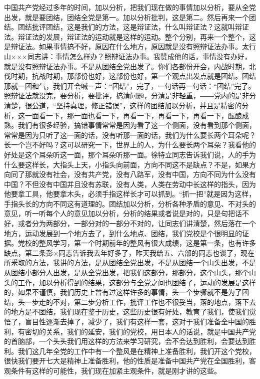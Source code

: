 中国共产党经过多年的时间，加以分析，把我们现在做的事情加以分析，要从全党出发，就是要团结，团结全党是第一。加以分析批判，这是第二。然后再来一个团结。团结批评团结，这是我们的方法，这是辩证法，什么叫辩证法？这就叫辩证法。辩证法的发展，辩证法的运动就是这样的运动。整个分别，再来一个整个，这是辩证法。如果事情搞不好，原因在什么地方，原因就是没有照辩证法办事。太行山×××同志讲：事情怎么样办？照辩证法办事。我赞成他的话，事情没有办好，就是没有照辩证法办事。不是从团结全党出发了。你们各部份开会，内战时期，北伐时期，抗战时期，那部份也好，这部份也好，第一个观点出发点就是团结。团结那就一团和气，我们开会喊一声：“团结”，完了，一句话再一句话：“团结”完了。照辩证法就没完，要分析，要批评，搞清问题，分清是非轻重，――党内的是非分清楚，很公道，“坚持真理，修正错误”，这样的团结加以分析，并且是精密的分析，这一面看一下，那一面也看一下，再看一下，再看一下，再看一下，酝酿成熟。我们有很多经验，搞错事情常常是因为看了这一个侧面，没有看到那个侧面，常常是因为只听了这一面的话，没有听那一面的话，我们为什么要长两个耳朵呢？长一个岂不好吗？这可以研究一下，世界上的人，为什么要长两个耳朵？我看他的好处是这个耳朵听这一面，那个耳朵听那一面。徐特立同志告诉我们说，人的手为什么要这样长，大指头上天，小指头向前面，方向不同这不是缺点？不是，如果方向同了那就没有社会，没有共产党，没有八路军，没有中国，方向不同为什么没有中国？不但没有中国并且没有苏联，没有人类，人类在劳动中长这样的指头，因为他要拿工具，他要拿木头，必须手指这样长才可以抓到。“抓一把”就是因为这样，手指头长的方向不同这有道理的。团结加以分析，分析各种矛盾的意见、不对头的意见，听一听每个人的意见加以分析，分析的结果或者说是对的，只是句把话不好，或者分为两部分，一部分对的一部分不对的，让同志们讲清楚，然后落在一个地方，运动发展到一个地方去了，到什么地点、团结，我们党校是个很明显的证据。党校的整风学习，第一个时期前年的整风有很大成绩，这是第一条，也有许多缺点，第二条彭×同志告诉我去年好多了，昨天我给五、六部的同志也谈了，现在所釆取的方法，我讲的方法，是从团结全党出发，不是从团结一个山头出发，不是从团结小部分人出发，是从全党出发，把我们这部分，那部分，这个山头，那个山头的工作，加以分析得到的结果，这部分与全党之间也团结了，运动的发展是这样的，如果不谨慎，我们历史上曾有过这样许多的事情，头一个步骤就不是为了团结，头一步走的不对，第二步分析工作，批评工作也不很妥当，落的地点，落下去的地方是不团结，我们现在鉴于历史，这些历史很有好处，教育了我们，使我们觉悟了，盲目性逐渐去掉了，减少了，我们有这样一套，这对于我们准备全中国的胜利，有密切的关系，我们的延安，我们的党校，用日本人的话说，就是中国共产党的首脑部，一个头头我们用这样的方法来学习研究，会不会达到胜利，会要达到胜利。我们这几年全党的工作中有一个整风是在精神上准备胜利，我们开这个党校，很快我们要开七大是精神上准备胜利，他的性质是准备中国共产党在全国胜利，客观条件有这样的可能性，我们现在加紧主观条件，就是刚才讲的这些。

